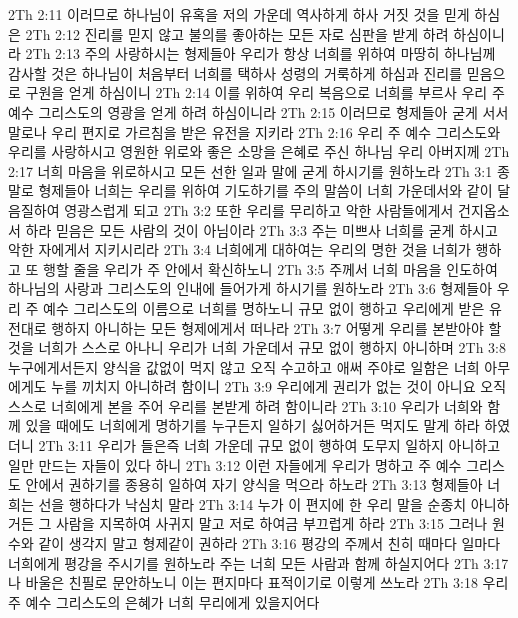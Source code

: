 2Th 2:11  이러므로 하나님이 유혹을 저의 가운데 역사하게 하사 거짓 것을 믿게 하심은
2Th 2:12  진리를 믿지 않고 불의를 좋아하는 모든 자로 심판을 받게 하려 하심이니라
2Th 2:13  주의 사랑하시는 형제들아 우리가 항상 너희를 위하여 마땅히 하나님께 감사할 것은 하나님이 처음부터 너희를 택하사 성령의 거룩하게 하심과 진리를 믿음으로 구원을 얻게 하심이니
2Th 2:14  이를 위하여 우리 복음으로 너희를 부르사 우리 주 예수 그리스도의 영광을 얻게 하려 하심이니라
2Th 2:15  이러므로 형제들아 굳게 서서 말로나 우리 편지로 가르침을 받은 유전을 지키라
2Th 2:16  우리 주 예수 그리스도와 우리를 사랑하시고 영원한 위로와 좋은 소망을 은혜로 주신 하나님 우리 아버지께
2Th 2:17  너희 마음을 위로하시고 모든 선한 일과 말에 굳게 하시기를 원하노라
2Th 3:1  종말로 형제들아 너희는 우리를 위하여 기도하기를 주의 말씀이 너희 가운데서와 같이 달음질하여 영광스럽게 되고
2Th 3:2  또한 우리를 무리하고 악한 사람들에게서 건지옵소서 하라 믿음은 모든 사람의 것이 아님이라
2Th 3:3  주는 미쁘사 너희를 굳게 하시고 악한 자에게서 지키시리라
2Th 3:4  너희에게 대하여는 우리의 명한 것을 너희가 행하고 또 행할 줄을 우리가 주 안에서 확신하노니
2Th 3:5  주께서 너희 마음을 인도하여 하나님의 사랑과 그리스도의 인내에 들어가게 하시기를 원하노라
2Th 3:6  형제들아 우리 주 예수 그리스도의 이름으로 너희를 명하노니 규모 없이 행하고 우리에게 받은 유전대로 행하지 아니하는 모든 형제에게서 떠나라
2Th 3:7  어떻게 우리를 본받아야 할 것을 너희가 스스로 아나니 우리가 너희 가운데서 규모 없이 행하지 아니하며
2Th 3:8  누구에게서든지 양식을 값없이 먹지 않고 오직 수고하고 애써 주야로 일함은 너희 아무에게도 누를 끼치지 아니하려 함이니
2Th 3:9  우리에게 권리가 없는 것이 아니요 오직 스스로 너희에게 본을 주어 우리를 본받게 하려 함이니라
2Th 3:10  우리가 너희와 함께 있을 때에도 너희에게 명하기를 누구든지 일하기 싫어하거든 먹지도 말게 하라 하였더니
2Th 3:11  우리가 들은즉 너희 가운데 규모 없이 행하여 도무지 일하지 아니하고 일만 만드는 자들이 있다 하니
2Th 3:12  이런 자들에게 우리가 명하고 주 예수 그리스도 안에서 권하기를 종용히 일하여 자기 양식을 먹으라 하노라
2Th 3:13  형제들아 너희는 선을 행하다가 낙심치 말라
2Th 3:14  누가 이 편지에 한 우리 말을 순종치 아니하거든 그 사람을 지목하여 사귀지 말고 저로 하여금 부끄럽게 하라
2Th 3:15  그러나 원수와 같이 생각지 말고 형제같이 권하라
2Th 3:16  평강의 주께서 친히 때마다 일마다 너희에게 평강을 주시기를 원하노라 주는 너희 모든 사람과 함께 하실지어다
2Th 3:17  나 바울은 친필로 문안하노니 이는 편지마다 표적이기로 이렇게 쓰노라
2Th 3:18  우리 주 예수 그리스도의 은혜가 너희 무리에게 있을지어다


